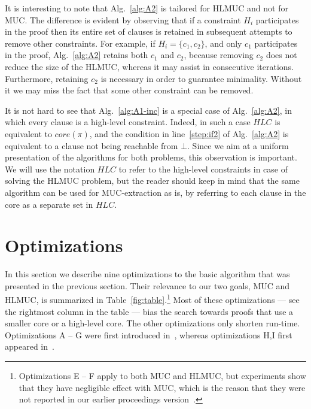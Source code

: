 \documentclass[twoside,11pt]{article}
\renewcommand\square{\bot}
\renewcommand\Pr{\pi}
\begin{document}
It is interesting to note that Alg.~\ref{alg:A2} is tailored for HLMUC and
not for MUC. The difference is evident by observing that if a constraint
$H_i$ participates in the proof then its entire set of clauses is retained in
subsequent attempts to remove other constraints. For example, if $H_i =
\{c_1,c_2\}$, and only $c_1$ participates in the proof, Alg.~\ref{alg:A2}
retains both $c_1$ and $c_2$, because removing $c_2$ does not reduce the size
of the HLMUC, whereas it may assist in consecutive iterations. Furthermore,
retaining $c_2$ is necessary in order to guarantee minimality. Without it we
may miss the fact that some other constraint can be removed.

It is not hard to see that Alg.~\ref{alg:A1-inc} is a special case of
Alg.~\ref{alg:A2}, in which every clause is a high-level constraint. Indeed,
in such a case $HLC$ is equivalent to $core(\Pr)$, and the condition in
line~\ref{step:if2} of Alg.~\ref{alg:A2} is equivalent to a clause not being
reachable from $\square$.
Since we aim at a uniform presentation of the algorithms for both problems, this observation is important. We will use the notation $HLC$ to refer to the high-level constraints in case of solving the HLMUC problem, but the reader should keep in mind that the same algorithm can be used for MUC-extraction as is, by referring to each clause in the core as a separate set in $HLC$.



\section{Optimizations}
\label{sec:opt} In this section we describe nine optimizations to the basic
algorithm that was presented in the previous section. Their relevance to our
two goals, MUC and HLMUC, is summarized in Table~\ref{fig:table}.\footnote{Optimizations E --
F apply to both MUC and HLMUC, but experiments show that they have negligible
effect with MUC, which is the reason that they were not reported in our earlier proceedings version~\cite{NRS13}.} Most of these
optimizations --- see the rightmost column in the table --- bias the search towards proofs that use a smaller core or a high-level core. The other optimizations only shorten run-time. Optimizations  A  -- G were first introduced in~\cite{RS11}, whereas optimizations H,I first appeared in~\cite{NRS13}.
\end{document}
